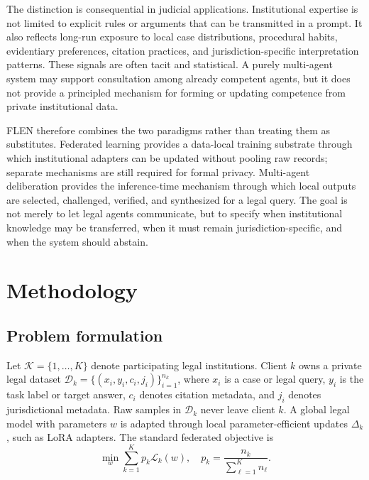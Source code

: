 \documentclass[preprint,12pt,authoryear]{elsarticle}
\newcommand{\client}{\mathcal{K}}
\newcommand{\dataset}{\mathcal{D}}
\newcommand{\loss}{\mathcal{L}}
\begin{document}
The distinction is consequential in judicial applications. Institutional expertise is not limited to explicit rules or arguments that can be transmitted in a prompt. It also reflects long-run exposure to local case distributions, procedural habits, evidentiary preferences, citation practices, and jurisdiction-specific interpretation patterns. These signals are often tacit and statistical. A purely multi-agent system may support consultation among already competent agents, but it does not provide a principled mechanism for forming or updating competence from private institutional data.

FLEN therefore combines the two paradigms rather than treating them as substitutes. Federated learning provides a data-local training substrate through which institutional adapters can be updated without pooling raw records; separate mechanisms are still required for formal privacy. Multi-agent deliberation provides the inference-time mechanism through which local outputs are selected, challenged, verified, and synthesized for a legal query. The goal is not merely to let legal agents communicate, but to specify when institutional knowledge may be transferred, when it must remain jurisdiction-specific, and when the system should abstain.



\section{Methodology}

\subsection{Problem formulation}

Let $\client=\{1,\ldots,K\}$ denote participating legal institutions. Client $k$ owns a private legal dataset $\dataset_k=\{(x_i,y_i,c_i,j_i)\}_{i=1}^{n_k}$, where $x_i$ is a case or legal query, $y_i$ is the task label or target answer, $c_i$ denotes citation metadata, and $j_i$ denotes jurisdictional metadata. Raw samples in $\dataset_k$ never leave client $k$. A global legal model with parameters $w$ is adapted through local parameter-efficient updates $\Delta_k$, such as LoRA adapters. The standard federated objective is
\begin{equation}
    \min_w \sum_{k=1}^{K} p_k \loss_k(w), \quad p_k=\frac{n_k}{\sum_{\ell=1}^{K} n_\ell}.
\end{equation}
\end{document}
